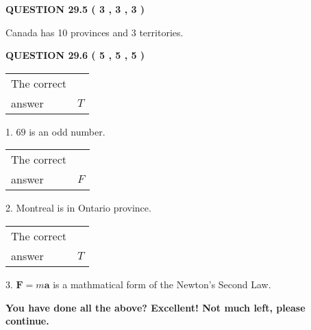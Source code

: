 \documentclass[12pt]{article}
\begin{document}
  
 
 
 
 
  
\vspace{0.2in}
  
{\textbf{\Large{QUESTION
29.5 
 (           3 ,           3 ,           3 )
}}}
  
  
 
 
\noindent{}
 
 
Canada has  %
10 provinces and  %
3 territories.
 
 
 
 
  
\vspace{0.2in}
  
{\textbf{\Large{QUESTION
29.6 
 (           5 ,           5 ,           5 )
}}}
  
  
 
 
\noindent{}

 
\noindent\begin{tabular}{|l|l|}\hline The correct & \\
          answer &  %
$T$ \\ \hline \end{tabular}
1. $ %
69$ is an  %
odd number.
 
\noindent\begin{tabular}{|l|l|}\hline The correct & \\
          answer &  %
$F$ \\ \hline \end{tabular}
2.  %
Montreal is in  %
Ontario province.
 
\noindent\begin{tabular}{|l|l|}\hline The correct & \\
          answer &  %
$T$ \\ \hline \end{tabular}
3.  %
$\mathbf{F}=m\mathbf{a}$ is a mathmatical form of  %
the Newton's Second Law.
 
 
 
   
   
\vspace{0.3in}
{\textbf{\LARGE{You have done all the above? Excellent! Not much left, please continue.}}}
\vspace{0.3in}
   
   
  
\end{document}
